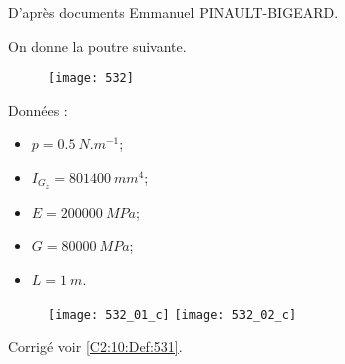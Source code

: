 \normaltrue
\correctionfalse


\setcounter{question}{0}

\begin{flushright}
\footnotesize{D'après documents Emmanuel PINAULT-BIGEARD.}
\end{flushright}


\ifcorrection
\else
{}
\fi

On donne la poutre suivante. 

\begin{figure}[H]
\centering
\texttt{[image: 532]}
\end{figure}

Données : 
\begin{itemize}
\item $p=\SI{0,5}{N.m^{-1}}$;
\item $I_{G_z} = \SI{801400}{mm^4}$;
\item $E = \SI{200000}{MPa}$;
\item $G = \SI{80000}{MPa}$;
\item $L= \SI{1}{m}$.
\end{itemize}

\ifprof
\else
\fi

\ifprof
\else
\fi

\ifprof
\else
\fi



\ifprof
\begin{figure}[H]
\centering
\texttt{[image: 532\_01\_c]}
\texttt{[image: 532\_02\_c]}
\end{figure}
\else

\begin{flushright}
\footnotesize{Corrigé  voir \ref{C2:10:Def:531}.}
\end{flushright}%
\fi